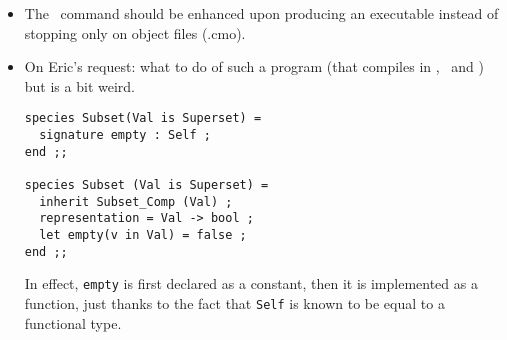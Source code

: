 \begin{itemize}
\item The \focalizec\ command should be enhanced upon producing an
  executable instead of stopping only on object files (.cmo).

\item On Eric's request: what to do of such a program (that compiles in
  \focal, \ocaml\ and \coq) but is a bit weird.
{\footnotesize
\begin{lstlisting}
species Subset(Val is Superset) =
  signature empty : Self ;
end ;;

species Subset (Val is Superset) =
  inherit Subset_Comp (Val) ;
  representation = Val -> bool ;
  let empty(v in Val) = false ;
end ;;
\end{lstlisting}
}

 In effect, {\tt empty} is first declared as a constant, then it is
 implemented as a function, just thanks to the fact that {\tt Self} is
 known to be equal to a functional type.
\end{itemize}
